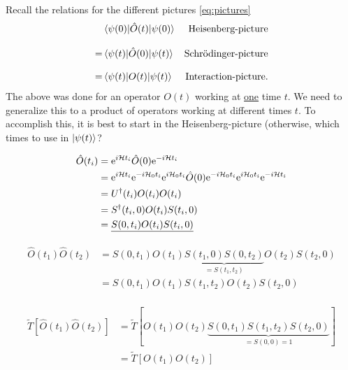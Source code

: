 Recall the relations for the different pictures \cref{eq:pictures} 
\begin{align*}
\nonumber
&\ev{\hat{O}(t)}{\psi(0)} & \text{Heisenberg-picture} \\[2ex] 
= &\ev{\hat{O}(0)}{\psi(t)} & \text{Schrödinger-picture} \\[2ex]
= &\ev{O(t)}{\psi(t)} & \text{Interaction-picture}.
\nonumber
\end{align*}
The above was done for an operator $O(t)$ working at \underline{one} time $t$. We need to generalize this to a product of operators working at different times $t$. To accomplish this, it is best to start in the Heisenberg-picture (otherwise, which times to use in $\ket{\psi(t)}$? 


\begin{align}
\begin{split} 
\hat{O}(t_i) &= \mathrm{e}^{i\mathcal{H} t_i}\hat{O}(0)\mathrm{e}^{-i\mathcal{H} t_i} \\
&= \mathrm{e}^{i\mathcal{H} t_i}\mathrm{e}^{-i\mathcal{H}_0 t_i}\mathrm{e}^{i\mathcal{H}_0 t_i}\hat{O}(0)\mathrm{e}^{-i\mathcal{H}_0t_i}\mathrm{e}^{i\mathcal{H}_0t_i}\mathrm{e}^{-i\mathcal{H} t_i} \\
&= U^\dagger(t_i)O(t_i)O(t_i) \\
&=S^\dagger(t_i, 0)O(t_i)S(t_i, 0)\\
&=\underline{S(0, t_i)O(t_i)S(t_i, 0)}
\end{split}
\end{align}

\begin{align}
\begin{split} 
\hat{O}(t_1)\hat{O}(t_2) &= S(0, t_1)O(t_1)\underbrace{S(t_1, 0)S(0, t_2)}_{=S(t_1, t_2)}O(t_2)S(t_2, 0) \\
&= S(0,t_1)O(t_1)S(t_1, t_2)O(t_2)S(t_2, 0)
\end{split}
\end{align}

\begin{align}
\begin{split}
\tilde{T}[\hat{O}(t_1)\hat{O}(t_2)] &= \tilde{T}[O(t_1)O(t_2)\underbrace{S(0,t_1)S(t_1, t_2)S(t_2, 0)}_{=S(0,0)=1}] \\
&=\tilde{T}[O(t_1)O(t_2)]
\end{split}
\end{align}

